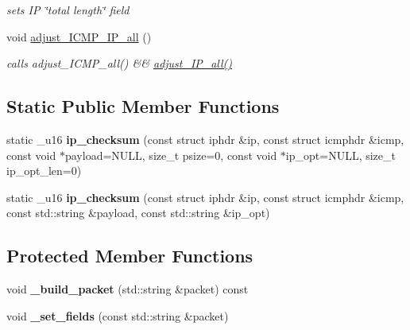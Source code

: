 \begin{CompactItemize}
\begin{CompactList}\small\item\em sets IP \char`\"{}total length\char`\"{} field \item\end{CompactList}\item 
\hypertarget{classsocketpp_1_1ICMP__IP__RawSocket_c3f54f7a266586af46e4bfa4494f90d6}{
void \hyperlink{classsocketpp_1_1ICMP__IP__RawSocket_c3f54f7a266586af46e4bfa4494f90d6}{adjust\_\-ICMP\_\-IP\_\-all} ()}
\label{classsocketpp_1_1ICMP__IP__RawSocket_c3f54f7a266586af46e4bfa4494f90d6}

\begin{CompactList}\small\item\em calls adjust\_\-ICMP\_\-all() \&\& \hyperlink{classsocketpp_1_1IP__RawSocket_45e60510233daaa2f279d3a4706fdce5}{adjust\_\-IP\_\-all()} \item\end{CompactList}\end{CompactItemize}
\subsection*{Static Public Member Functions}
\begin{CompactItemize}
\item 
\hypertarget{classsocketpp_1_1ICMP__IP__RawSocket_65eb1bc40fd501a49fee9055e22229dc}{
static \_\-u16 \textbf{ip\_\-checksum} (const struct iphdr \&ip, const struct icmphdr \&icmp, const void $\ast$payload=NULL, size\_\-t psize=0, const void $\ast$ip\_\-opt=NULL, size\_\-t ip\_\-opt\_\-len=0)}
\label{classsocketpp_1_1ICMP__IP__RawSocket_65eb1bc40fd501a49fee9055e22229dc}

\item 
\hypertarget{classsocketpp_1_1ICMP__IP__RawSocket_0723a72dc06b401f6dd101a25da6348f}{
static \_\-u16 \textbf{ip\_\-checksum} (const struct iphdr \&ip, const struct icmphdr \&icmp, const std::string \&payload, const std::string \&ip\_\-opt)}
\label{classsocketpp_1_1ICMP__IP__RawSocket_0723a72dc06b401f6dd101a25da6348f}

\end{CompactItemize}
\subsection*{Protected Member Functions}
\begin{CompactItemize}
\item 
\hypertarget{classsocketpp_1_1ICMP__IP__RawSocket_ccfc4205717c474435dcf7e2603d1200}{
void \textbf{\_\-build\_\-packet} (std::string \&packet) const }
\label{classsocketpp_1_1ICMP__IP__RawSocket_ccfc4205717c474435dcf7e2603d1200}

\item 
\hypertarget{classsocketpp_1_1ICMP__IP__RawSocket_6d2f188d46030afa13f9c3971d43d518}{
void \textbf{\_\-set\_\-fields} (const std::string \&packet)}
\label{classsocketpp_1_1ICMP__IP__RawSocket_6d2f188d46030afa13f9c3971d43d518}

\end{CompactItemize}


